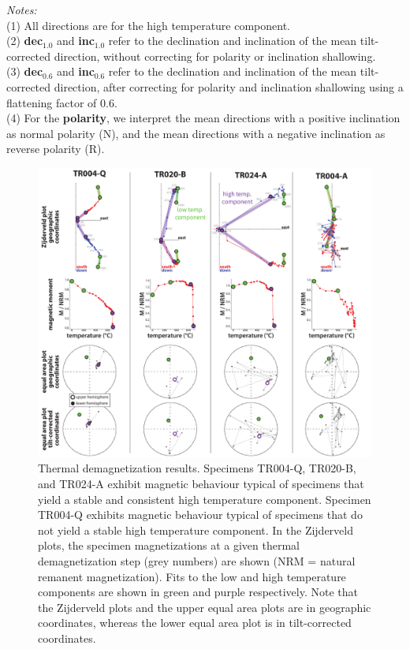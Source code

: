 \begin{table}[h!]
\scriptsize
\flushleft \emph{Notes:} \\
(1) All directions are for the high temperature component.\\
(2) \textbf{dec$_{1.0}$} and \textbf{inc$_{1.0}$} refer to the declination and inclination of the mean tilt-corrected direction, without correcting for polarity or inclination shallowing.\\
(3) \textbf{dec$_{0.6}$} and \textbf{inc$_{0.6}$} refer to the declination and inclination of the mean tilt-corrected direction, after correcting for polarity and inclination shallowing using a flattening factor of 0.6.\\
(4) For the \textbf{polarity}, we interpret the mean directions with a positive inclination as normal polarity (N), and the mean directions with a negative inclination as reverse polarity (R).
\label{tab:site-means}
\end{table}

\begin{figure}[h!]
    \centering
    \includegraphics[width=\textwidth]{figures/Xiajiang/representative-specimens.pdf}
    \caption[Thermal demagnetization results.]{Thermal demagnetization results. Specimens TR004-Q, TR020-B, and TR024-A exhibit magnetic behaviour typical of specimens that yield a stable and consistent high temperature component. Specimen TR004-Q exhibits magnetic behaviour typical of specimens that do not yield a stable high temperature component. In the Zijderveld plots, the specimen magnetizations at a given thermal demagnetization step (grey numbers) are shown (NRM = natural remanent magnetization). Fits to the low and high temperature components are shown in green and purple respectively. Note that the Zijderveld plots and the upper equal area plots are in geographic coordinates, whereas the lower equal area plot is in tilt-corrected coordinates.}
    \label{fig:representative-specimens}
\end{figure}

